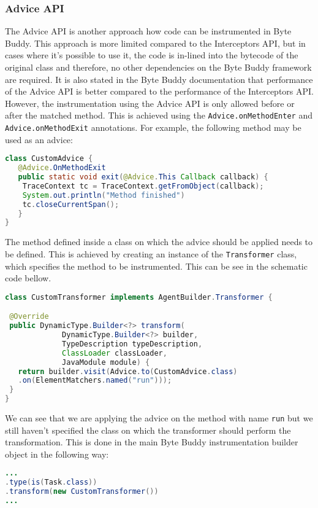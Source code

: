 \subsubsection{Advice API}
The Advice API is another approach how code can be instrumented in Byte Buddy. This approach is more limited compared to the Interceptors API, but in cases where it's possible to use it, the code is in-lined into the bytecode of the original class and therefore, no other dependencies on the Byte Buddy framework are required. It is also stated in the Byte Buddy documentation that performance of the Advice API is better compared to the performance of the Interceptors API. However, the instrumentation using the Advice API is only allowed before or after the matched method. This is achieved using the \texttt{Advice.onMethodEnter} and \texttt{Advice.onMethodExit} annotations. For example, the following method may be used as an advice: 
\begin{lstlisting}[language=Java]
class CustomAdvice {
   @Advice.OnMethodExit
   public static void exit(@Advice.This Callback callback) {
   	TraceContext tc = TraceContext.getFromObject(callback);
   	System.out.println("Method finished")
   	tc.closeCurrentSpan();
   }
}   
\end{lstlisting}

The method defined inside a class on which the advice should be applied needs to be defined. This is achieved by creating an instance of the \texttt{Transformer} class, which specifies the method to be instrumented. This can be see in the schematic code bellow.

\begin{lstlisting}[language=Java]
class CustomTransformer implements AgentBuilder.Transformer {

 @Override
 public DynamicType.Builder<?> transform(
			 DynamicType.Builder<?> builder,
			 TypeDescription typeDescription,
			 ClassLoader classLoader,
			 JavaModule module) {
   return builder.visit(Advice.to(CustomAdvice.class)
   .on(ElementMatchers.named("run")));
 }
}
\end{lstlisting}
We can see that we are applying the advice on the method with name \texttt{run} but we still haven't specified the class on which the transformer should perform the transformation. This is done in the main Byte Buddy instrumentation builder object in the following way:

\begin{lstlisting}[language=Java]
...
.type(is(Task.class))
.transform(new CustomTransformer())
...
\end{lstlisting}

